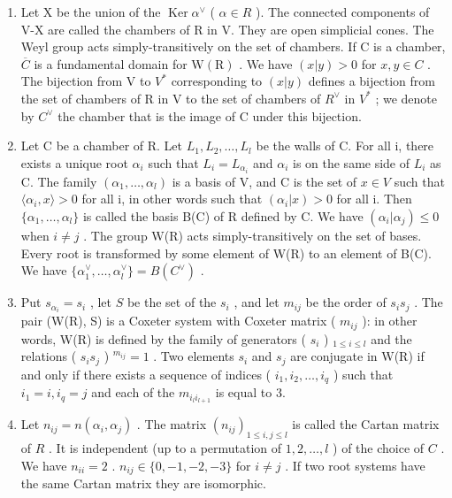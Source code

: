 \begin{enumerate}
\def\labelenumi{\arabic{enumi})}
\setcounter{enumi}{8}
\item
  Let X be the union of the \(\operatorname{Ker}\alpha^{\vee}\) ( \(\alpha\in R\) ). The connected components of V-X are called the chambers of R in V. They are open simplicial cones. The Weyl group acts simply-transitively on the set of chambers. If C is a chamber, \(\overline{C}\) is a fundamental domain for \(\mathrm{W}(\mathrm{R})\) . We have \((x|y)>0\) for \(x,y\in C\) . The bijection from V to \(V^{*}\) corresponding to \((x|y)\) defines a bijection from the set of chambers of R in V to the set of chambers of \(R^{\vee}\) in \(V^{*}\) ; we denote by \(C^{\vee}\) the chamber that is the image of C under this bijection.
\item
  Let C be a chamber of R. Let \(L_{1}, L_{2}, \ldots, L_{l}\) be the walls of C. For all i, there exists a unique root \(\alpha_{i}\) such that \(L_{i} = L_{\alpha_{i}}\) and \(\alpha_{i}\) is on the same side of \(L_{i}\) as C. The family \((\alpha_{1}, \ldots, \alpha_{l})\) is a basis of V, and C is the set of \(x \in V\) such that \(\langle \alpha_{i}, x \rangle > 0\) for all i, in other words such that \((\alpha_{i} | x) > 0\) for all i. Then \(\{\alpha_{1}, \ldots, \alpha_{l}\}\) is called the basis B(C) of R defined by C. We have \((\alpha_{i} | \alpha_{j}) \leqslant 0\) when \(i \neq j\) . The group W(R) acts simply-transitively on the set of bases. Every root is transformed by some element of W(R) to an element of B(C). We have \(\{\alpha_{1}^{\vee}, \ldots, \alpha_{l}^{\vee}\} = B(C^{\vee})\) .
\item
  Put \(s_{\alpha_i} = s_i\) , let \(S\) be the set of the \(s_i\) , and let \(m_{ij}\) be the order of \(s_i s_j\) . The pair (W(R), S) is a Coxeter system with Coxeter matrix ( \(m_{ij}\) ): in other words, W(R) is defined by the family of generators ( \(s_i\) ) \(_{1 \leqslant i \leqslant l}\) and the relations ( \(s_i s_j\) ) \(^{m_{ij}} = 1\) . Two elements \(s_i\) and \(s_j\) are conjugate in W(R) if and only if there exists a sequence of indices ( \(i_1, i_2, \ldots, i_q\) ) such that \(i_1 = i, i_q = j\) and each of the \(m_{i_l i_{l+1}}\) is equal to 3.
\item
  Let \(n_{ij} = n(\alpha_i, \alpha_j)\) . The matrix \((n_{ij})_{1 \leqslant i,j \leqslant l}\) is called the Cartan matrix of \(R\) . It is independent (up to a permutation of \(1, 2, \ldots, l\) ) of the choice of \(C\) . We have \(n_{ii} = 2\) . \(n_{ij} \in \{0, -1, -2, -3\}\) for \(i \neq j\) . If two root systems have the same Cartan matrix they are isomorphic.

\end{enumerate}
